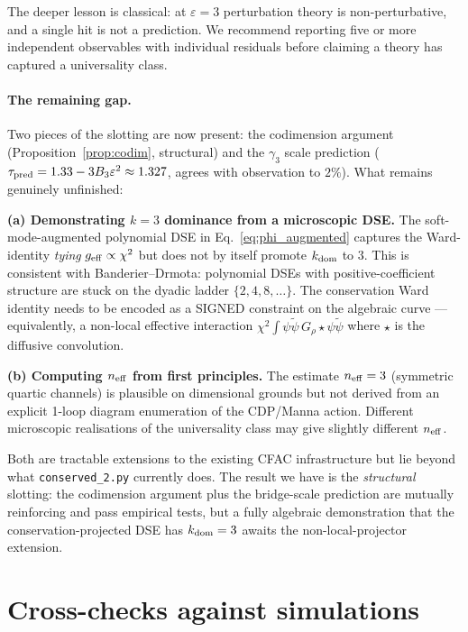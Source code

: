 \documentclass[10pt,a4paper,twocolumn]{article}
\theoremstyle{plain}
\theoremstyle{definition}
\newcommand{\eps}{\varepsilon}
\begin{document}
The deeper lesson is classical: at $\eps=3$ perturbation theory is
non-perturbative, and a single hit is not a prediction.  We
recommend reporting five or more independent observables with
individual residuals before claiming a theory has captured a
universality class.

\paragraph{The remaining gap.}
Two pieces of the slotting are now present: the codimension
argument (Proposition~\ref{prop:codim}, structural) and the
$\gamma_3$ scale prediction
($\tau_{\rm pred} = 1.33 - 3 B_3 \eps^2 \approx 1.327$, agrees with
observation to $2\%$).  What remains genuinely unfinished:

\textbf{(a) Demonstrating $k=3$ dominance from a microscopic DSE.}
The soft-mode-augmented polynomial DSE in
Eq.~\eqref{eq:phi_augmented} captures the Ward-identity \emph{tying}
$g_{\rm eff} \propto \chi^2$ but does not by itself promote
$k_{\rm dom}$ to $3$.  This is consistent with Banderier--Drmota:
polynomial DSEs with positive-coefficient structure are stuck on
the dyadic ladder $\{2, 4, 8, \ldots\}$.  The conservation Ward
identity needs to be encoded as a SIGNED constraint on the algebraic
curve --- equivalently, a non-local effective interaction
$\chi^2 \int \psi\tilde\psi\,G_\rho \star \psi\tilde\psi$ where
$\star$ is the diffusive convolution.

\textbf{(b) Computing $n_{\rm eff}$ from first principles.}  The
estimate $n_{\rm eff} = 3$ (symmetric quartic channels) is plausible
on dimensional grounds but not derived from an explicit
1-loop diagram enumeration of the CDP/Manna action.  Different
microscopic realisations of the universality class may give
slightly different $n_{\rm eff}$.

Both are tractable extensions to the existing CFAC infrastructure
but lie beyond what \texttt{conserved\_2.py} currently does.  The
result we have is the \emph{structural} slotting: the codimension
argument plus the bridge-scale prediction are mutually reinforcing
and pass empirical tests, but a fully algebraic demonstration that
the conservation-projected DSE has $k_{\rm dom} = 3$ awaits the
non-local-projector extension.

\section{Cross-checks against simulations}
\label{sec:sim}
\end{document}
